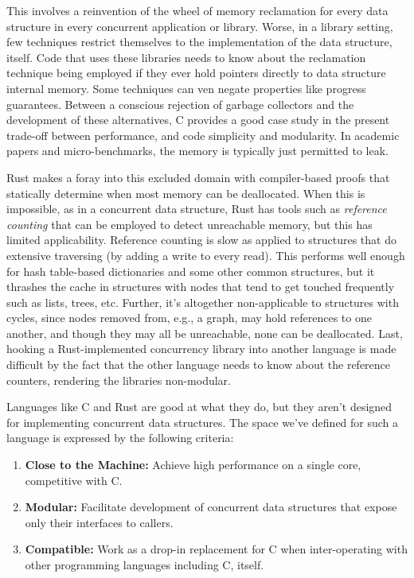This involves a reinvention of the wheel of memory reclamation for every data structure in every concurrent application or library.  Worse, in a library setting, few techniques restrict themselves to the implementation of the data structure, itself.  Code that uses these libraries needs to know about the reclamation technique being employed if they ever hold pointers directly to data structure internal memory.  Some techniques can ven negate properties like progress guarantees.\cite{Brown15}  Between a conscious rejection of garbage collectors and the development of these alternatives, C provides a good case study in the present trade-off between performance, and code simplicity and modularity.  In academic papers and micro-benchmarks, the memory is typically just permitted to leak.

Rust makes a foray into this excluded domain with compiler-based proofs that statically determine when most memory can be deallocated.\cite{Rust}  When this is impossible, as in a concurrent data structure, Rust has tools such as \textit{reference counting} that can be employed to detect unreachable memory, but this has limited applicability.  Reference counting is slow as applied to structures that do extensive traversing (by adding a write to every read).  This performs well enough for hash table-based dictionaries and some other common structures, but it thrashes the cache in structures with nodes that tend to get touched frequently such as lists, trees, etc.  Further, it's altogether non-applicable to structures with cycles, since nodes removed from, e.g., a graph, may hold references to one another, and though they may all be unreachable, none can be deallocated.  Last, hooking a Rust-implemented concurrency library into another language is made difficult by the fact that the other language needs to know about the reference counters, rendering the libraries non-modular.

Languages like C and Rust are good at what they do, but they aren't designed for implementing concurrent data structures.  The space we've defined for such a language is expressed by the following criteria:

\begin{enumerate}
        \item \textbf{Close to the Machine:} Achieve high performance on a single core, competitive with C.
        \item \textbf{Modular:} Facilitate development of concurrent data structures that expose only their interfaces to callers.
        \item \textbf{Compatible:} Work as a drop-in replacement for C when inter-operating with other programming languages including C, itself.
\end{enumerate}


